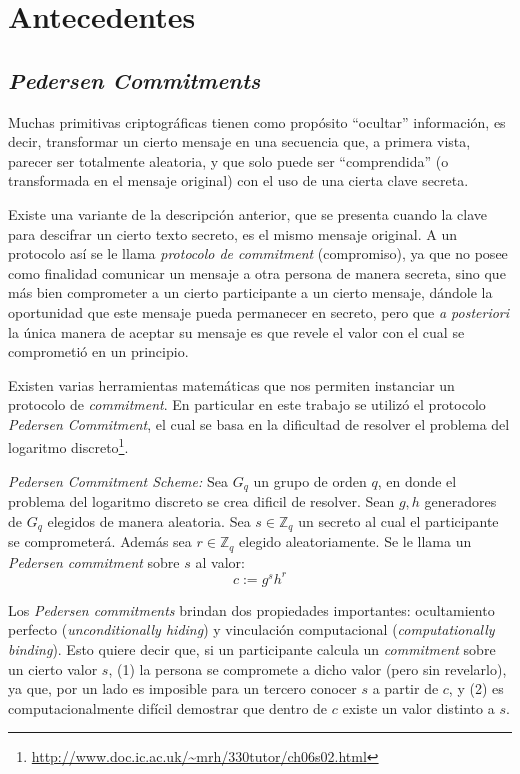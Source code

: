 \chapter{Antecedentes}
\section{\emph{Pedersen Commitments}}

Muchas primitivas criptográficas tienen como propósito ``ocultar'' información, es decir, transformar un cierto mensaje en una secuencia que, a primera vista, parecer ser totalmente aleatoria, y que solo puede ser ``comprendida'' (o transformada en el mensaje original) con el uso de una cierta clave secreta.

Existe una variante de la descripción anterior, que se presenta cuando la clave para descifrar un cierto texto secreto, es el mismo mensaje original. A un protocolo así se le llama \emph{protocolo de commitment} (compromiso), ya que no posee como finalidad comunicar un mensaje a otra persona de manera secreta, sino que más bien comprometer a un cierto participante a un cierto mensaje, dándole la oportunidad que este mensaje pueda permanecer en secreto, pero que \emph{a posteriori} la única manera de aceptar su mensaje es que revele el valor con el cual se comprometió en un principio.


Existen varias herramientas matemáticas que nos permiten instanciar un protocolo de \emph{commitment}. En particular en este trabajo se utilizó el protocolo \emph{Pedersen Commitment}\cite{pedersen1991non}, el cual se basa en la dificultad de resolver el problema del logaritmo discreto\footnote{\url{http://www.doc.ic.ac.uk/~mrh/330tutor/ch06s02.html}}.

\emph{Pedersen Commitment Scheme:} Sea $G_q$ un grupo de orden $q$, en donde el problema del logaritmo discreto se crea dificil de resolver. Sean $g,h$ generadores de $G_q$ elegidos de manera aleatoria. Sea $s \in \mathbb{Z}_q$ un secreto al cual el participante se comprometerá. Además sea $r \in \mathbb{Z}_q$ elegido aleatoriamente. Se le llama un \emph{Pedersen commitment} sobre $s$ al valor: $$c := g^s h^r$$

Los \emph{Pedersen commitments} brindan dos propiedades importantes: 
  ocultamiento perfecto (\emph{unconditionally hiding}) y 
  vinculación computacional (\emph{computationally binding}). 
Esto quiere decir que, si un participante calcula un \emph{commitment} sobre un 
  cierto valor $s$, 
  (1) la persona se compromete a dicho valor (pero sin revelarlo), ya que, 
  por un lado es imposible para un tercero conocer $s$ a partir de $c$, 
  y (2) es computacionalmente difícil demostrar que dentro de $c$ existe un valor distinto a $s$.


